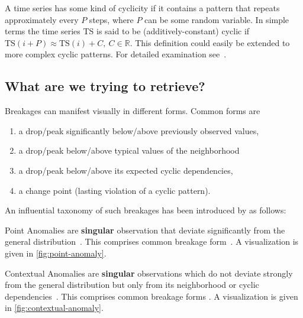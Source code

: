 \begin{definition}[Cyclicity]\label{def:cyclicity}
    A time series has some kind of cyclicity if it contains a pattern that repeats
    approximately every \(P\) steps, where \(P\) can be some random variable. In
    simple terms the time series TS is said to be (additively-constant) cyclic
    if \(\text{TS}(i + P) \approx \text{TS}(i) + C,\ C\in \mathbb{R}\). This
    definition could easily be extended to more complex cyclic patterns. For
    detailed examination see~\cite{Falk.2012}.
\end{definition}

\subsection{What are we trying to retrieve?}
Breakages can manifest visually in different forms. Common forms are
\begin{enumerate}
    \item\label{itm:1} a drop/peak significantly below/above previously observed values,
    \item\label{itm:2} a drop/peak below/above typical values of the neighborhood
    \item\label{itm:3} a drop/peak below/above its expected cyclic dependencies,
    \item\label{itm:4} a change point (lasting violation of a cyclic pattern).
\end{enumerate}
An influential taxonomy of such breakages has been introduced by \textcite{Chandola.2009}
as follows:

\begin{definition}\label{def:point-anomaly}
    Point Anomalies are \textbf{singular} observation that deviate significantly
    from the general distribution~\cite[cf.][]{Chandola.2009}. This comprises
    common breakage form~. A visualization is given in
    \cref{fig:point-anomaly}.
\end{definition}

\begin{definition}\label{def:contextual-anomaly}
    Contextual Anomalies are \textbf{singular} observations which do not deviate
    strongly from the general distribution but only from its neighborhood or
    cyclic dependencies~\cite[cf.][]{Chandola.2009}. This comprises common breakage
    forms . A visualization is given in
    \cref{fig:contextual-anomaly}.
\end{definition}
 
